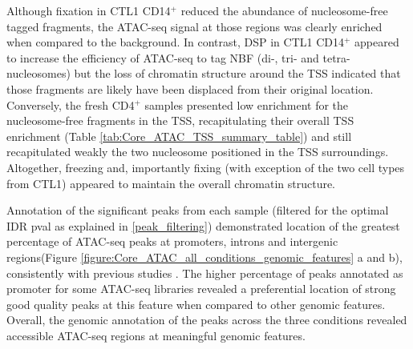 Although fixation in CTL1 CD14$^+$ reduced the abundance of nucleosome-free tagged fragments, the ATAC-seq signal at those regions was clearly enriched when compared to the background. In contrast, DSP in CTL1 CD14$^+$ appeared to increase the efficiency of ATAC-seq to tag NBF (di-, tri- and tetra-nucleosomes) but the loss of chromatin structure around the TSS indicated that those fragments are likely have been displaced from their original location. Conversely, the fresh CD4$^+$ samples presented low enrichment for the nucleosome-free fragments in the TSS, recapitulating their overall TSS enrichment (Table \ref{tab:Core_ATAC_TSS_summary_table}) and still recapitulated weakly the two nucleosome positioned in the TSS surroundings. Altogether, freezing and, importantly fixing (with exception of the two cell types from CTL1) appeared to maintain the overall chromatin structure.

Annotation of the significant peaks from each sample (filtered for the optimal IDR pval as explained in \ref{peak_filtering}) demonstrated location of the greatest percentage of ATAC-seq peaks at promoters, introns and intergenic regions(Figure \ref{figure:Core_ATAC_all_conditions_genomic_features} a and b), consistently with previous studies \parencite{Buenrostro2013,Scharer2016}. The higher percentage of peaks annotated as promoter for some ATAC-seq libraries revealed a preferential location of strong good quality peaks at this feature when compared to other genomic features. Overall, the genomic annotation of the peaks across the three conditions revealed accessible ATAC-seq regions at meaningful genomic features. 

